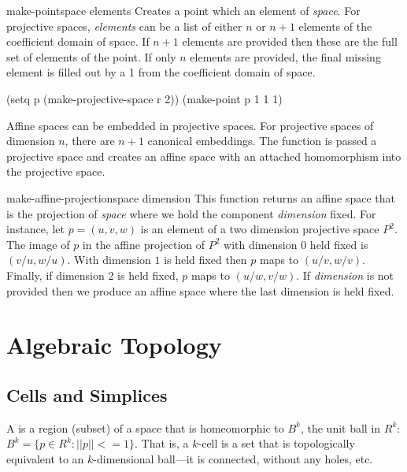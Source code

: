 \begin{functiondef}{make-point}{space \rest elements}
Creates a point which an element of {\em space}.  For projective
spaces, {\em elements} can be a list of either $n$ or $n+1$ elements
of the coefficient domain of space.  If $n+1$ elements are provided
then these are the full set of elements of the point.  If only $n$
elements are provided, the final missing element is filled out by a 1
from the coefficient domain of space.
\end{functiondef}
  
\begin{code}
(setq p (make-projective-space r 2))
(make-point p 1 1 1)
\end{code}
  
Affine spaces can be embedded in projective spaces.  For projective
spaces of dimension $n$, there are $n+1$ canonical embeddings. The
function  is passed a projective space
and creates an affine space with an attached homomorphism into the
projective space.
  
\begin{functiondef}{make-affine-projection}{space \optional dimension}  
This function returns an affine space that is the projection of {\em
space} where we hold the component {\em dimension} fixed.  For
instance, let $p = (u, v, w)$ is an element of a two dimension
projective space $P^2$. The image of $p$ in the affine projection of
$P^2$ with dimension $0$ held fixed is $(v/u, w/u)$.  With dimension
$1$ is held fixed then $p$ maps to $(u/v, w/v)$. Finally, if dimension
2 is held fixed, $p$ maps to $(u/w, v/w)$. If {\em dimension} is not
provided then we produce an affine space where the last dimension is
held fixed.
\end{functiondef}
  
\section{Algebraic Topology}
\label{AlgebraicTopology:Sec}

\subsection{Cells and Simplices}

A  is a region (subset) of a space that is homeomorphic
to $B^k$, the unit ball in $R^k$: $B^k = \{p \in R^k : ||p|| <= 1\}$.
That is, a $k$-cell is a set that is topologically equivalent to an
$k$-dimensional ball---it is connected, without any holes, etc.
  
